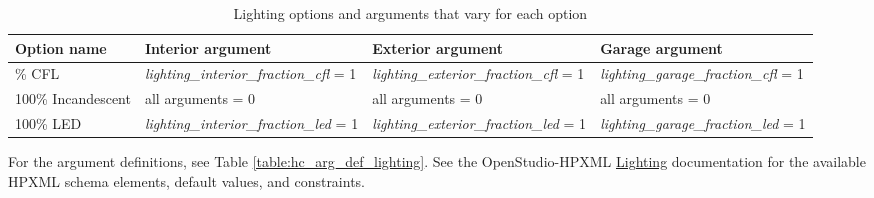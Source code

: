 \begin{longtable}[]{|p{2.8cm}|p{3.5cm}|p{3.5cm}|p{3.5cm}|}
\caption{Lighting options and arguments that vary for each option}\\
\toprule\noalign{}
Option name & Interior argument & Exterior argument & Garage argument\\
\midrule\noalign{}
\endhead
\bottomrule\noalign{}
\endlastfoot
100\% CFL & \textit{lighting\_interior\_fraction\_cfl} = 1 &\textit{lighting\_exterior\_fraction\_cfl} = 1 & \textit{lighting\_garage\_fraction\_cfl} = 1  \\
\hline
100\% Incandescent & all arguments = 0 & all arguments = 0  & all arguments = 0  \\
\hline
100\% LED & \textit{lighting\_interior\_fraction\_led} = 1 &\textit{lighting\_exterior\_fraction\_led} = 1 & \textit{lighting\_garage\_fraction\_led} = 1 \\
\end{longtable}



For the argument definitions, see Table \ref{table:hc_arg_def_lighting}. See the OpenStudio-HPXML \href{https://openstudio-hpxml.readthedocs.io/en/v1.8.1/workflow_inputs.html#hpxml-lighting}{Lighting} documentation for the available HPXML schema elements, default values, and constraints.


